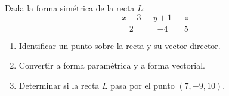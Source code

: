 Dada la forma simétrica de la recta $L$:
\[ \frac{x - 3}{2} = \frac{y + 1}{-4} = \frac{z}{5} \]
\begin{enumerate}
    \item Identificar un punto sobre la recta y su vector director.
    \item Convertir a forma paramétrica y a forma vectorial.
    \item Determinar si la recta $L$ pasa por el punto $(7, -9, 10)$.
\end{enumerate}